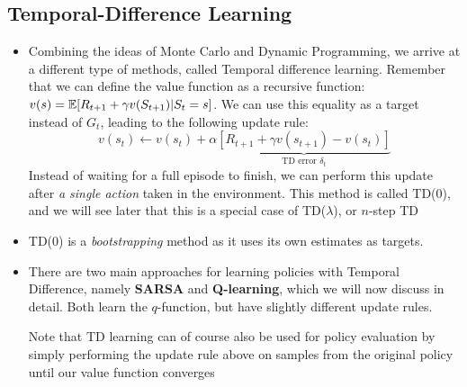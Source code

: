 \subsection{Temporal-Difference Learning}
\begin{itemize}
	\item Combining the ideas of Monte Carlo and Dynamic Programming, we arrive at a different type of methods, called Temporal difference learning. Remember that we can define the value function as a recursive function: $v(s)=\mathbb{E}[R_{t+1}+\gamma v(S_{t+1})|S_t=s]$. We can use this equality as a target instead of $G_t$, leading to the following update rule:
	$$v(s_t)\leftarrow v(s_t)+\alpha\underbrace{\left[R_{t+1}+\gamma v(s_{t+1}) - v(s_t)\right]}_{\text{TD error } \delta_t}$$
	Instead of waiting for a full episode to finish, we can perform this update after \textit{a single action} taken in the environment. This method is called TD(0), and we will see later that this is a special case of TD($\lambda$), or $n$-step TD
	\item TD(0) is a \textit{bootstrapping} method as it uses its own estimates as targets. 
	\item There are two main approaches for learning policies with Temporal Difference, namely \textbf{SARSA} and \textbf{Q-learning}, which we will now discuss in detail. Both learn the $q$-function, but have slightly different update rules.
	
	Note that TD learning can of course also be used for policy evaluation by simply performing the update rule above on samples from the original policy until our value function converges
\end{itemize}
